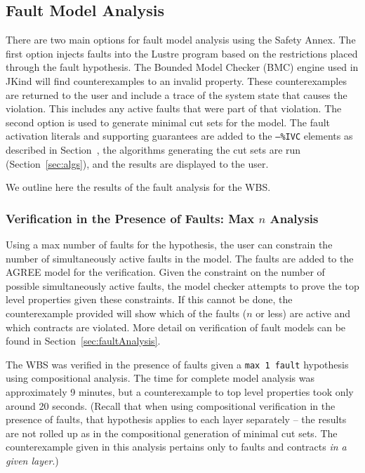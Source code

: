 \subsection{Fault Model Analysis}
There are two main options for fault model analysis using the Safety Annex. The first option injects faults into the Lustre program based on the restrictions placed through the fault hypothesis. The Bounded Model Checker (BMC) engine used in JKind will find counterexamples to an invalid property. These counterexamples are returned to the user and include a trace of the system state that causes the violation. This includes any active faults that were part of that violation. The second option is used to generate minimal cut sets for the model. The fault activation literals and supporting guarantees are added to the \texttt{--\%IVC} elements as described in Section~\label{sec:formMCS}, the algorithms generating the cut sets are run (Section~\ref{sec:algs}), and the results are displayed to the user. 

We outline here the results of the fault analysis for the WBS. 

\subsubsection{Verification in the Presence of Faults: Max $n$ Analysis}
Using a max number of faults for the hypothesis, the user can constrain the number of simultaneously active faults in the model. The faults are added to the AGREE model for the verification. Given the constraint on the number of possible simultaneously active faults, the model checker attempts to prove the top level properties given these constraints. If this cannot be done, the counterexample provided will show which of the faults ($n$ or less) are active and which contracts are violated. More detail on verification of fault models can be found in Section~\ref{sec:faultAnalysis}. 

The WBS was verified in the presence of faults given a \texttt{max 1 fault} hypothesis using compositional analysis. The time for complete model analysis was approximately 9 minutes, but a counterexample to top level properties took only around 20 seconds. (Recall that when using compositional verification in the presence of faults, that hypothesis applies to each layer separately -- the results are not rolled up as in the compositional generation of minimal cut sets. The counterexample given in this analysis pertains only to faults and contracts \textit{in a given layer}.) 

